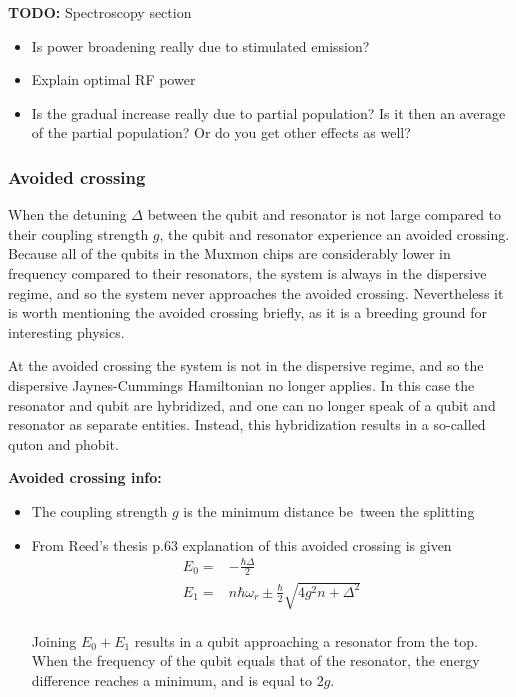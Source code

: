           \textbf{TODO:} Spectroscopy section
          \begin{itemize}
              \item Is power broadening really due to stimulated emission?
              \item Explain optimal RF power
              \item Is the gradual increase really due to partial population? Is it then an average of the partial population? Or do you get other effects as well?
          \end{itemize}


        \subsubsection{Avoided crossing}
          When the detuning $\Delta$ between the qubit and resonator is not large compared to their coupling strength $g$, the qubit and resonator experience an avoided crossing. Because all of the qubits in the Muxmon chips are considerably lower in frequency compared to their resonators, the system is always in the dispersive regime, and so the system never approaches the avoided crossing. Nevertheless it is worth mentioning the avoided crossing briefly, as it is a breeding ground for interesting physics.

          At the avoided crossing the system is not in the dispersive regime, and so the dispersive Jaynes-Cummings Hamiltonian no longer applies. In this case the resonator and qubit are hybridized, and one can no longer speak of a qubit and resonator as separate entities. Instead, this hybridization results in a so-called quton and phobit.

          \textbf{Avoided crossing info:}
          \begin{itemize}
            \item The coupling strength $g$ is the minimum distance be~tween the splitting
            \item From Reed's thesis p.63 explanation of this avoided crossing is given\\
            \begin{align}
             E_0 = & -\frac{\hbar \Delta}{2}\\
             E_1 = & n \hbar\omega_r \pm \frac{\hbar}{2}\sqrt{4g^2n + \Delta^2}
            \end{align}\\
            Joining $E_0 + E_1$ results in a qubit approaching a resonator from the top.\\
            When the frequency of the qubit equals that of the resonator, the energy difference reaches a minimum, and is equal to $2g$.
          \end{itemize}

